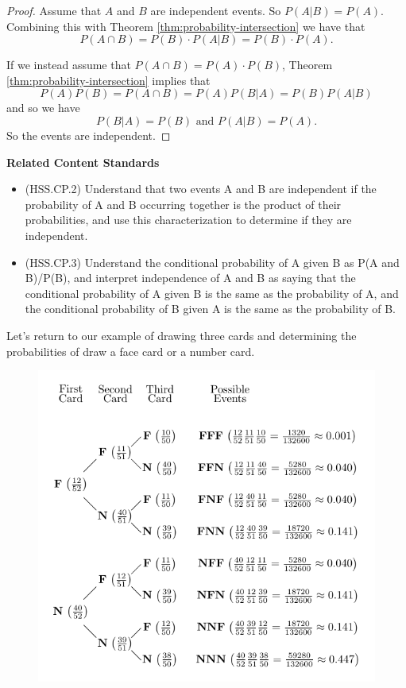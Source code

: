 \documentclass[
]{book}
\providecommand{\tightlist}{%
  \setlength{\itemsep}{0pt}\setlength{\parskip}{0pt}}
\newenvironment{standards}{}{}
\theoremstyle{definition}
\theoremstyle{definition}
\theoremstyle{definition}
\theoremstyle{definition}
\theoremstyle{remark}
\begin{document}
\begin{proof}

Assume that \(A\) and \(B\) are independent events. So \(P(A|B)=P(A)\). Combining this with Theorem \ref{thm:probability-intersection} we have that \[P(A\cap B) = P(B)\cdot P(A|B) = P(B)\cdot P(A).\]

If we instead assume that \(P(A\cap B)=P(A)\cdot P(B)\), Theorem \ref{thm:probability-intersection} implies that
\[P(A) P(B) = P(A\cap B) = P(A) P(B|A) = P(B)P(A|B)\] and so we have
\[P(B|A) = P(B) \mbox{ and } P(A|B)=P(A).\] So the events are independent.

\end{proof}

\begin{standards}

\begin{center}
\textbf{Related Content Standards}

\end{center}

\begin{itemize}
\tightlist
\item
  (HSS.CP.2) Understand that two events A and B are independent if the probability of A and B occurring together is the product of their probabilities, and use this characterization to determine if they are independent.
\item
  (HSS.CP.3) Understand the conditional probability of A given B as P(A and B)/P(B), and interpret independence of A and B as saying that the conditional probability of A given B is the same as the probability of A, and the conditional probability of B given A is the same as the probability of B.
\end{itemize}

\end{standards}

Let's return to our example of drawing three cards and determining the probabilities of draw a face card or a number card.

\begin{figure}

{\centering \includegraphics[width=0.65\linewidth]{tikz/tree_cards_face} 

}

\end{figure}
\end{document}
